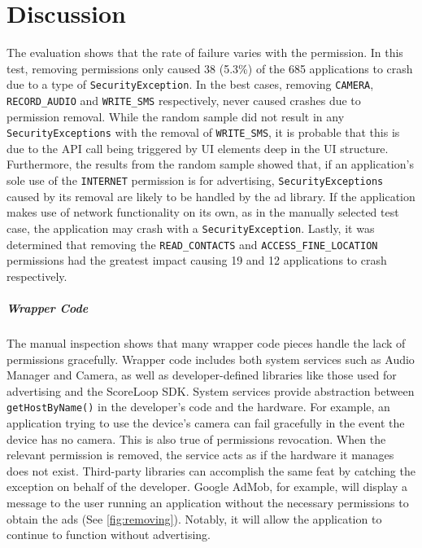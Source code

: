 
\chapter{Discussion}
\label{sec:discussion}

The evaluation shows that the rate of failure varies with the permission.  In this test, removing permissions only caused 38 (5.3\%) of the 685 applications to crash due to a type of \texttt{SecurityException}.   In the best cases, removing \texttt{CAMERA}, \texttt{RECORD\_AUDIO} and \texttt{WRITE\_SMS} respectively, never caused crashes due to permission removal.  While the random sample did not result in any \texttt{SecurityExceptions} with the removal of \texttt{WRITE\_SMS}, it is probable that this is due to the API call being triggered by UI elements deep in the UI structure.  Furthermore, the results from the random sample showed that, if an application's sole use of the \texttt{INTERNET} permission is for advertising, \texttt{SecurityExceptions} caused by its removal are likely to be handled by the ad library.  If the application makes use of network functionality on its own, as in the manually selected test case, the application may crash with a \texttt{SecurityException}. Lastly, it was determined that removing the \texttt{READ\_CONTACTS} and \texttt{ACCESS\_FINE\_LOCATION} permissions had the greatest impact causing 19 and 12 applications to crash respectively.      

\paragraph{\bfseries Wrapper Code}
The manual inspection shows that many wrapper code pieces handle the lack of permissions gracefully.  Wrapper code includes both system services such as Audio Manager and Camera, as well as developer-defined libraries like those used for advertising and the ScoreLoop SDK.  System services provide abstraction between \texttt{getHostByName()} in the developer's code and the hardware.  For example, an application trying to use the device's camera can fail gracefully in the event the device has no camera.  This is also true of permissions revocation.  When the relevant permission is removed, the service acts as if the hardware it manages does not exist.  Third-party libraries can accomplish the same feat by catching the exception on behalf of the developer.  Google AdMob, for example, will display a message to the user running an application without the necessary permissions to obtain the ads (See \ref{fig:removing}).  Notably, it will allow the application to continue to function without advertising.  

